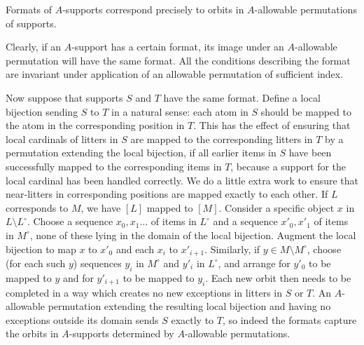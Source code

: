 \documentclass{slides}
\begin{document}
\begin{slide}

Formats of $A$-supports correspond precisely to orbits in $A$-allowable permutations of supports.

Clearly, if an $A$-support has a certain format, its image under an $A$-allowable permutation will have the same format.  All the conditions describing the format
are invariant under application of an allowable permutation of sufficient index.

Now suppose that supports $S$ and $T$ have the same format.  Define a local bijection sending $S$ to $T$ in a natural sense:  each atom in $S$ should be mapped to the atom in the corresponding position in $T$.  This has the effect of ensuring that local cardinals of litters in $S$ are mapped to the corresponding litters in $T$ by a permutation extending the local bijection, if all earlier items in $S$ have been successfully mapped to the corresponding items in $T$, because a support for the local cardinal has been handled correctly.  We do a little extra work to ensure that near-litters in corresponding positions are mapped exactly to each other.   If $L$ corresponds to $M$, we have $[L]$ mapped to $[M]$.  Consider a specific object $x$ in
$L \setminus L^\circ$.  Choose a sequence $x_0, x_1\ldots$ of items in $L^\circ$ and a sequence $x'_0,x'_1$ of items in $M^\circ$, none of these lying in the domain of the local bijection.
Augment the local bijection to map $x$ to $x'_0$ and each $x_i$ to $x'_{i+1}$.   Similarly, if $y \in M\setminus M^\circ$, choose (for each such $y$) sequences $y_i$ in $M^\circ$ and
$y'_i$ in $L^\circ$, and arrange for $y'_0$ to be mapped to $y$ and for $y'_{i+1}$ to be mapped to $y_i$.  Each new orbit then needs to be completed in a way which creates no new exceptions in litters in $S$ or $T$.  An $A$-allowable permutation extending the resulting local bijection and having no exceptions outside its domain sends $S$ exactly to $T$, so indeed the formats capture the
orbits in $A$-supports determined by $A$-allowable permutations.

\end{slide}
\end{document}
